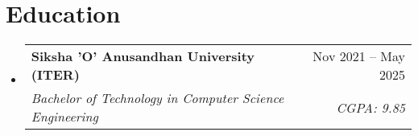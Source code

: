 
\newcommand{\resumeItem}[1]{
  \item\small{
    {#1 \vspace{-2pt}}
  }
}

\newcommand{\resumeSubheading}[4]{
  \vspace{2pt}\item
  \begin{tabular*}{0.97\textwidth}[t]{l@{\extracolsep{\fill}}r}
    \textbf{#1} & #2 \\
    \textit{\small#3} & \textit{\small #4} \\
  \end{tabular*}\vspace{-5pt}
}

\newcommand{\resumeSubSubheading}[2]{
  \item
  \begin{tabular*}{0.97\textwidth}{l@{\extracolsep{\fill}}r}
    \textit{\small#1} & \textit{\small #2} \\
  \end{tabular*}\vspace{-7pt}
}

\newcommand{\resumeProjectHeading}[2]{
  \item
  \begin{tabular*}{0.97\textwidth}{l@{\extracolsep{\fill}}r}
    \small#1 & #2 \\
  \end{tabular*}\vspace{-5pt}
}

\newcommand{\resumeSubItem}[1]{\resumeItem{#1}\vspace{-4pt}}

\renewcommand\labelitemii{$\vcenter{\hbox{\tiny$\bullet$}}$}

\newcommand{\resumeSubHeadingListStart}{\begin{itemize}[leftmargin=0.15in, label={}]}
    \newcommand{\resumeSubHeadingListEnd}{\vspace{-10pt}\end{itemize}}
\newcommand{\resumeItemListStart}{\begin{itemize}}
    \newcommand{\resumeItemListEnd}{\end{itemize}\vspace{0pt}}

\section{Education}
\resumeSubHeadingListStart
\resumeSubheading
{Siksha 'O' Anusandhan University (ITER)}{Nov 2021 -- May 2025}
{Bachelor of Technology in Computer Science Engineering}{ CGPA: 9.85 }
\resumeSubHeadingListEnd


